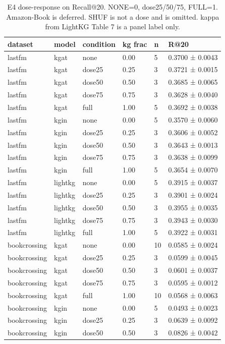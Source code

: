\begin{table}[t]
\centering
\caption{E4 dose-response on Recall@20. NONE=0, dose25/50/75, FULL=1. Amazon-Book is deferred. SHUF is not a dose and is omitted. kappa from LightKG Table 7 is a panel label only.}
\label{tab:e4}
\begin{tabular}{llllll}
\hline
dataset & model & condition & kg frac & n & R@20 \\
\hline
lastfm & kgat & none & 0.00 & 5 & 0.3700 ± 0.0043 \\
lastfm & kgat & dose25 & 0.25 & 3 & 0.3721 ± 0.0015 \\
lastfm & kgat & dose50 & 0.50 & 3 & 0.3685 ± 0.0065 \\
lastfm & kgat & dose75 & 0.75 & 3 & 0.3628 ± 0.0040 \\
lastfm & kgat & full & 1.00 & 5 & 0.3692 ± 0.0038 \\
lastfm & kgin & none & 0.00 & 5 & 0.3570 ± 0.0060 \\
lastfm & kgin & dose25 & 0.25 & 3 & 0.3606 ± 0.0052 \\
lastfm & kgin & dose50 & 0.50 & 3 & 0.3643 ± 0.0013 \\
lastfm & kgin & dose75 & 0.75 & 3 & 0.3638 ± 0.0099 \\
lastfm & kgin & full & 1.00 & 5 & 0.3654 ± 0.0070 \\
lastfm & lightkg & none & 0.00 & 5 & 0.3915 ± 0.0037 \\
lastfm & lightkg & dose25 & 0.25 & 3 & 0.3901 ± 0.0024 \\
lastfm & lightkg & dose50 & 0.50 & 3 & 0.3955 ± 0.0035 \\
lastfm & lightkg & dose75 & 0.75 & 3 & 0.3943 ± 0.0030 \\
lastfm & lightkg & full & 1.00 & 5 & 0.3922 ± 0.0031 \\
bookcrossing & kgat & none & 0.00 & 10 & 0.0585 ± 0.0024 \\
bookcrossing & kgat & dose25 & 0.25 & 3 & 0.0599 ± 0.0045 \\
bookcrossing & kgat & dose50 & 0.50 & 3 & 0.0601 ± 0.0037 \\
bookcrossing & kgat & dose75 & 0.75 & 3 & 0.0595 ± 0.0012 \\
bookcrossing & kgat & full & 1.00 & 10 & 0.0568 ± 0.0063 \\
bookcrossing & kgin & none & 0.00 & 5 & 0.0493 ± 0.0023 \\
bookcrossing & kgin & dose25 & 0.25 & 3 & 0.0639 ± 0.0092 \\
bookcrossing & kgin & dose50 & 0.50 & 3 & 0.0826 ± 0.0042 \\

\end{tabular}
\end{table}
